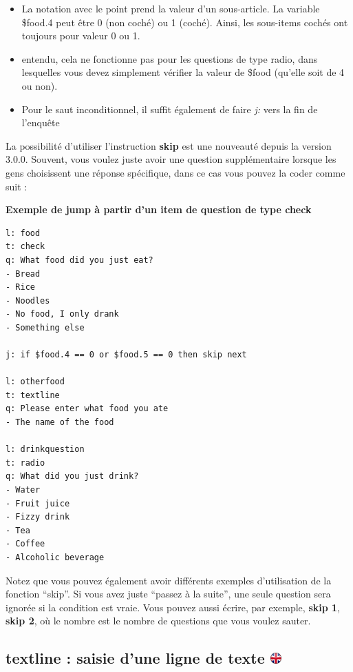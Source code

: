 \documentclass[
]{book}
\providecommand{\tightlist}{%
  \setlength{\itemsep}{0pt}\setlength{\parskip}{0pt}}
\begin{document}
\begin{itemize}
\tightlist
\item
  La notation avec le point prend la valeur d'un sous-article. La variable \$food.4 peut être 0 (non coché) ou 1 (coché). Ainsi, les sous-items cochés ont toujours pour valeur 0 ou 1.
\item
  entendu, cela ne fonctionne pas pour les questions de type radio, dans lesquelles vous devez simplement vérifier la valeur de \$food (qu'elle soit de 4 ou non).
\item
  Pour le saut inconditionnel, il suffit également de faire \emph{j:} vers la fin de l'enquête
\end{itemize}

La possibilité d'utiliser l'instruction \textbf{skip} est une nouveauté depuis la version 3.0.0. Souvent, vous voulez juste avoir une question supplémentaire lorsque les gens choisissent une réponse spécifique, dans ce cas vous pouvez la coder comme suit :

\textbf{Exemple de jump à partir d'un item de question de type check}

\begin{verbatim}
l: food
t: check
q: What food did you just eat?
- Bread
- Rice
- Noodles
- No food, I only drank
- Something else

j: if $food.4 == 0 or $food.5 == 0 then skip next

l: otherfood
t: textline
q: Please enter what food you ate
- The name of the food

l: drinkquestion
t: radio
q: What did you just drink?
- Water
- Fruit juice
- Fizzy drink
- Tea
- Coffee
- Alcoholic beverage
\end{verbatim}

Notez que vous pouvez également avoir différents exemples d'utilisation de la fonction ``skip''. Si vous avez juste ``passez à la suite'', une seule question sera ignorée si la condition est vraie. Vous pouvez aussi écrire, par exemple, \textbf{skip 1}, \textbf{skip 2}, où le nombre est le nombre de questions que vous voulez sauter.

\hypertarget{textline-saisie-dune-ligne-de-texte}{%
\subsection[textline : saisie d'une ligne de texte ]{\texorpdfstring{textline : saisie d'une ligne de texte \href{https://www.psytoolkit.org/doc3.4.0/online-survey-syntax.html\#textline}{\protect\includegraphics{img/ukflag.png}}}{textline : saisie d'une ligne de texte }}\label{textline-saisie-dune-ligne-de-texte}}
\end{document}
